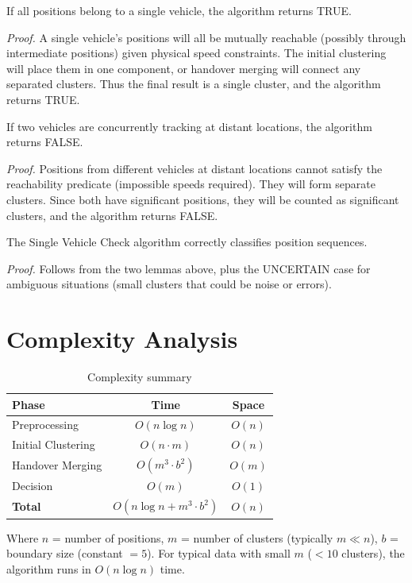 \begin{lemma}
If all positions belong to a single vehicle, the algorithm returns TRUE.
\end{lemma}
\textit{Proof.} A single vehicle's positions will all be mutually reachable (possibly through intermediate positions) given physical speed constraints. The initial clustering will place them in one component, or handover merging will connect any separated clusters. Thus the final result is a single cluster, and the algorithm returns TRUE.

\begin{lemma}
If two vehicles are concurrently tracking at distant locations, the algorithm returns FALSE.
\end{lemma}
\textit{Proof.} Positions from different vehicles at distant locations cannot satisfy the reachability predicate (impossible speeds required). They will form separate clusters. Since both have significant positions, they will be counted as significant clusters, and the algorithm returns FALSE.

\begin{theorem}
The Single Vehicle Check algorithm correctly classifies position sequences.
\end{theorem}
\textit{Proof.} Follows from the two lemmas above, plus the UNCERTAIN case for ambiguous situations (small clusters that could be noise or errors).

\section{Complexity Analysis}

\begin{table}[h]
\centering
\caption{Complexity summary}
\label{tab:complexity}
\begin{tabular}{|l|c|c|}
\hline
\textbf{Phase} & \textbf{Time} & \textbf{Space} \\
\hline
Preprocessing & $O(n \log n)$ & $O(n)$ \\
Initial Clustering & $O(n \cdot m)$ & $O(n)$ \\
Handover Merging & $O(m^3 \cdot b^2)$ & $O(m)$ \\
Decision & $O(m)$ & $O(1)$ \\
\hline
\textbf{Total} & $O(n \log n + m^3 \cdot b^2)$ & $O(n)$ \\
\hline
\end{tabular}
\end{table}

Where $n$ = number of positions, $m$ = number of clusters (typically $m \ll n$), $b$ = boundary size (constant $= 5$). For typical data with small $m$ ($< 10$ clusters), the algorithm runs in $O(n \log n)$ time.

